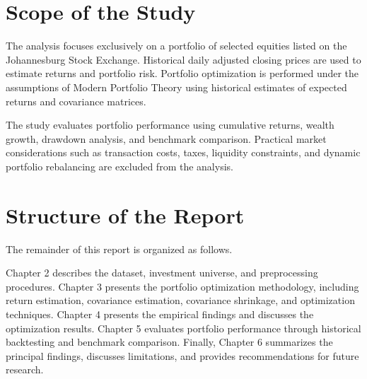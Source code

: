 \section{Scope of the Study}

The analysis focuses exclusively on a portfolio of selected equities listed on the Johannesburg Stock Exchange. Historical daily adjusted closing prices are used to estimate returns and portfolio risk. Portfolio optimization is performed under the assumptions of Modern Portfolio Theory using historical estimates of expected returns and covariance matrices.

The study evaluates portfolio performance using cumulative returns, wealth growth, drawdown analysis, and benchmark comparison. Practical market considerations such as transaction costs, taxes, liquidity constraints, and dynamic portfolio rebalancing are excluded from the analysis.

\section{Structure of the Report}

The remainder of this report is organized as follows.

Chapter 2 describes the dataset, investment universe, and preprocessing procedures. Chapter 3 presents the portfolio optimization methodology, including return estimation, covariance estimation, covariance shrinkage, and optimization techniques. Chapter 4 presents the empirical findings and discusses the optimization results. Chapter 5 evaluates portfolio performance through historical backtesting and benchmark comparison. Finally, Chapter 6 summarizes the principal findings, discusses limitations, and provides recommendations for future research.